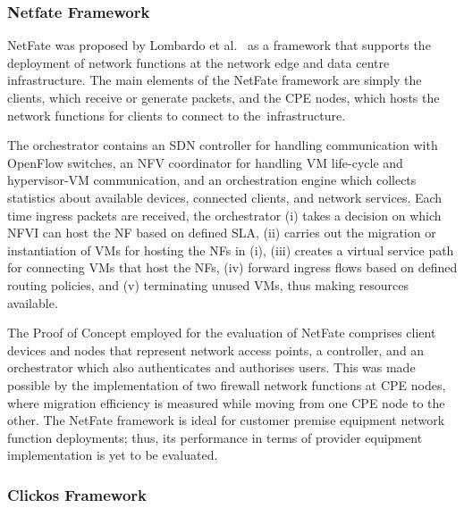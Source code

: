 \documentclass[futureinternet,review,accept,pdftex,moreauthors]{Definitions/mdpi}
\begin{document}
\subsubsection{Netfate Framework}
\label{NetFate}
NetFate was proposed by Lombardo {et al.}~\cite{lombardo2015open} as a framework that supports the deployment of network functions at the network edge and data centre infrastructure. The main elements of the NetFate framework are simply the clients, which receive or generate packets, and the CPE nodes, which hosts the network functions for clients to connect to the~infrastructure. 

The orchestrator contains an SDN controller for handling communication with OpenFlow switches, an NFV coordinator for handling VM life-cycle and hypervisor-VM communication, and an orchestration engine which collects statistics about available devices, connected clients, and network services. Each time ingress packets are received, the orchestrator (i) takes a decision on which NFVI can host the NF based on defined SLA, (ii) carries out the migration or instantiation of VMs for hosting the NFs in (i), (iii) creates a virtual service path for connecting VMs that host the NFs, (iv) forward ingress flows based on defined routing policies, and (v) terminating unused VMs, thus making resources available. 

The Proof of Concept employed for the evaluation of NetFate comprises client devices and nodes that represent network access points, a controller, and an orchestrator which also authenticates and authorises users. This was made possible by the implementation of two firewall network functions at CPE nodes, where migration efficiency is measured while moving from one CPE node to the other. The NetFate framework is ideal for customer premise equipment network function deployments; thus, its performance in terms of provider equipment implementation is yet to be evaluated.


\subsubsection{Clickos Framework}
\label{clickOS}
\end{document}
